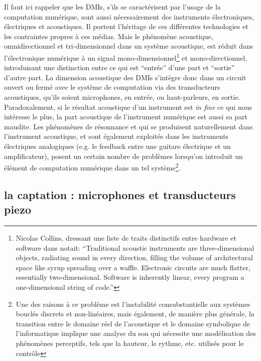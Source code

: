 \noindent Il faut ici rappeler que les \glspl{DMI}, s'ils se caractérisent par l'usage de la computation numérique, sont aussi nécessairement des instruments électroniques, électriques et acoustiques. Il portent l'héritage de ces différentes technologies et les contraintes propres à ces médias. Mais le phénomène acoustique, omnidirectionnel et tri-dimensionnel dans un système acoustique, est réduit dans l'électronique numérique à un signal mono-dimensionnel\footnote{Nicolas Collins, dressant une liste de traits distinctifs entre hardware et software dans \cite{collins_semiconducting_2013} notait: ``Traditional acoustic instruments are three-dimensional objects, radiating sound in every direction, filling the volume of architectural space like syrup spreading over a waffle. Electronic circuits are much flatter, essentially two-dimensional. Software is inherently linear, every program a one-dimensional string of code.''} et mono-directionnel, introduisant une distinction entre ce qui est ``entrée'' d'une part et ``sortie'' d'autre part. La dimension acoustique des \glspl{DMI} s'intègre donc dans un circuit ouvert ou fermé avec le système de computation via des transducteurs acoustiques, qu'ils soient microphones, en entrée, ou haut-parleurs, en sortie.\\
\indent Paradoxalement, si le résultat acoustique d'un instrument est \textit{in fine} ce qui nous intéresse le plus, la part acoustique de l'instrument numérique est aussi sa part maudite. Les phénomènes de résonnance et qui se produisent naturellement dans l'instrument acoustique, et sont également exploités dans les instruments électriques analogiques (e.g. le feedback entre une guitare électrique et un amplificateur), posent un certain nombre de problèmes lorsqu'on introduit un élément de computation numérique dans un tel système\footnote{Une des raisons à ce problème est l'instabilité consubstantielle aux systèmes bouclés discrets et non-linéaires, mais également, de manière plus générale, la transition entre le domaine réel de l'acoustique et le domaine symbolique de l'informatique implique une analyse du son qui nécessite une modélisation des phénomènes perceptifs, tels que la hauteur, le rythme, etc. utilisés pour le contrôle}.\\

\subsection{la captation : microphones et transducteurs piezo}

